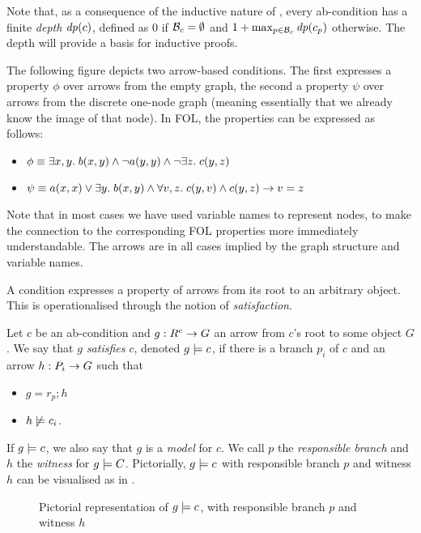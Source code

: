 Note that, as a consequence of the inductive nature of , every ab-condition has a finite \emph{depth} $\mathit{dp}(c)$, defined as $0$ if $\mathcal{B}_c=\emptyset$ and $1+\max_{p\in \mathcal{B}_c} \mathit{dp}(c_p)$ otherwise. The depth will provide a basis for inductive proofs.

\begin{example}
The following figure depicts two arrow-based conditions. The first expresses a property $\phi$ over arrows from the empty graph, the second a property $\psi$ over arrows from the discrete one-node graph (meaning essentially that we already know the image of that node). In FOL, the properties can be expressed as follows:
\begin{itemize}
\item $\phi\equiv \exists x,y.\; b(x,y) \wedge \neg a(y,y)\wedge \neg \exists z.\; c(y,z)$
\item $\psi\equiv a(x,x)\vee \exists y.\; b(x,y) \wedge \forall v,z.\; c(y,v)\wedge c(y,z) \rightarrow v=z$
\end{itemize}
Note that in most cases we have used variable names to represent nodes, to make the connection to the corresponding FOL properties more immediately understandable. The arrows are in all cases implied by the graph structure and variable names.
\begin{center}

\end{center}
\end{example}
%
A condition expresses a property of arrows from its root to an arbitrary object. This is operationalised through the notion of \emph{satisfaction}.

\begin{definition}
  Let $c$ be an ab-condition and $g:R^c\rightarrow G$ an arrow from $c$'s root to some object $G$. We say that \emph{$g$ satisfies $c$}, denoted $g\models c$, if there is a branch $p_i$ of $c$ and an arrow $h:P_i\rightarrow G$ such that
  \begin{itemize}
  \item $g=r_p;h$
  \item $h\not\models c_i$.
  \end{itemize}
\end{definition}
%
If $g\models c$, we also say that $g$ is a \emph{model} for $c$. We call $p$ the \emph{responsible branch} and $h$ the \emph{witness} for $g\models C$. Pictorially, $g\models c$ with responsible branch $p$ and witness $h$ can be visualised as in .
%
\begin{figure}
  \centering
  
  \caption{Pictorial representation of $g\models c$, with responsible branch $p$ and witness $h$}
\end{figure}

